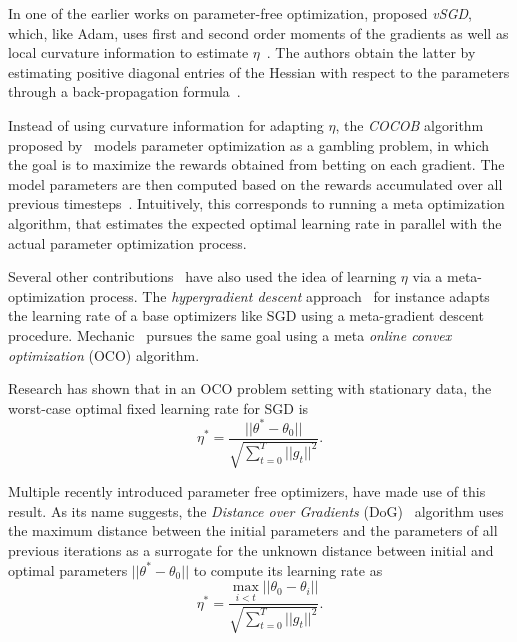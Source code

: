 \documentclass[letterpaper]{article} %
\begin{document}
In one of the earlier works on parameter-free optimization, \citet{schaulNoMorePesky2013} proposed \textit{vSGD}, which, like Adam, uses first and second order moments of the gradients as well as local curvature information to estimate $\eta$~\cite{schaulNoMorePesky2013}.
The authors obtain the latter by estimating positive diagonal entries of the Hessian with respect to the parameters through a back-propagation formula~\cite{schaulNoMorePesky2013}.

Instead of using curvature information for adapting $\eta$, the \textit{COCOB} algorithm proposed by~\citet{orabonaTrainingDeepNetworks2017} models parameter optimization as a gambling problem, in which the goal is to maximize the rewards obtained from betting on each gradient.
The model parameters are then computed based on the rewards accumulated over all previous timesteps~\cite{orabonaTrainingDeepNetworks2017}.
Intuitively, this corresponds to running a meta optimization algorithm, that estimates the expected optimal learning rate in parallel with the actual parameter optimization process.

Several other contributions~\cite{vanervenMetaGradMultipleLearning2016a,baydinOnlineLearningRate2018,cutkoskyMechanicLearningRate2023} have also used the idea of learning $\eta$ via a meta-optimization process.
The \textit{hypergradient descent} approach~\cite{baydinOnlineLearningRate2018} for instance adapts the learning rate of a base optimizers like SGD using a meta-gradient descent procedure.
Mechanic~\cite{cutkoskyMechanicLearningRate2023} pursues the same goal using a meta \textit{online convex optimization} (OCO) algorithm.

Research has shown that in an OCO problem setting with stationary data, the worst-case optimal fixed learning rate for SGD is
\begin{equation}\label{eq:oco_optimal_lr}
	\eta^* = \frac{||\theta^* - \theta_0||}{\sqrt{\sum_{t=0}^{T} ||g_t||^2}}.
\end{equation}

Multiple recently introduced parameter free optimizers, have made use of this result.
As its name suggests, the \textit{Distance over Gradients} (DoG)~\cite{ivgiDoGSGDBest2023} algorithm uses the maximum distance between the initial parameters and the parameters of all previous iterations as a surrogate for the unknown distance between initial and optimal parameters $||\theta^* - \theta_0||$ to compute its learning rate as
\begin{equation}
	\eta^* = \frac{\max_{i<t}||\theta_0 - \theta_i||}{\sqrt{\sum_{t=0}^{T} ||g_t||^2}}.
\end{equation}
\end{document}
